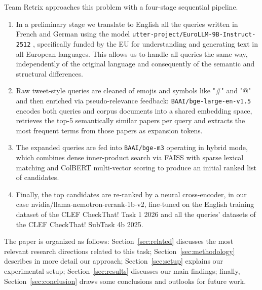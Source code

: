 Team Retrix approaches this problem with a four-stage sequential pipeline.
\begin{enumerate}
    \item In a preliminary stage we translate to English all the queries written in French and German using the model \texttt{utter-project/EuroLLM-9B-Instruct-2512} \cite{eurollm-9b-instruct}, specifically funded by the EU for understanding and generating text in all European languages. This allows us to handle all queries the same way, independently of the original language and consequently of the semantic and structural differences.

    \item Raw tweet-style queries are cleaned of emojis and symbols like "\#" and "@" and then enriched via pseudo-relevance feedback: \texttt{BAAI/bge-large-en-v1.5} \cite{bge-large-en-v1.5} encodes both queries and corpus documents into a shared embedding space, retrieves the top-5 semantically similar papers per query and extracts the most frequent terms from those papers as expansion tokens.
    
    \item The expanded queries are fed into \texttt{BAAI/bge-m3} \cite{bge-m3-hf} operating in hybrid mode, which combines dense inner-product search via FAISS \cite{faiss_documentation} with sparse lexical matching and ColBERT multi-vector scoring to produce an initial ranked list of candidates.

    \item Finally, the top candidates are re-ranked by a neural cross-encoder, in our case nvidia/llama-nemotron-rerank-1b-v2, fine-tuned on the English training dataset of the CLEF CheckThat! Task 1 2026 and all the queries' datasets of the  CLEF CheckThat! SubTask 4b 2025.
\end{enumerate}  

The paper is organized as follows: Section~\ref{sec:related} discusses the most relevant research directions related to this task; Section~\ref{sec:methodology} describes in more detail our approach; Section~\ref{sec:setup} explains our experimental setup; Section~\ref{sec:results} discusses our main findings; finally, Section~\ref{sec:conclusion} draws some conclusions and outlooks for future work.